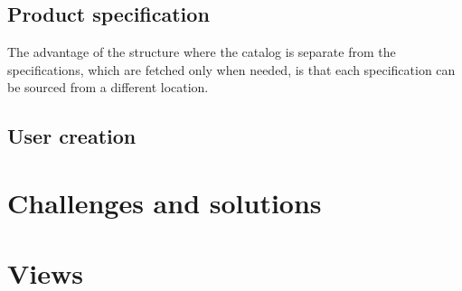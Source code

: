 \subsection{Product specification}

The advantage of the structure where the catalog is separate from the specifications, which are fetched only when needed, is that each specification can be sourced from a different location.



\subsection{User creation}

\section{Challenges and solutions}


\section{Views}
